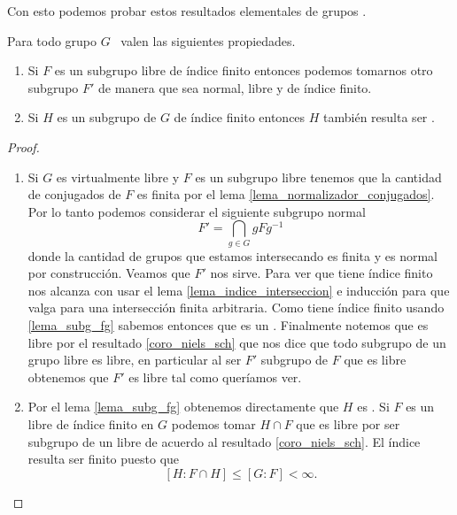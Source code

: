 \documentclass[tesis.tex]{subfiles}
\begin{document}
Con esto podemos probar estos resultados elementales de grupos \vl.

\begin{prop}\label{prop_vls}
	Para todo grupo $G$ \vl \ valen las siguientes propiedades.
	\begin{enumerate}
		\item Si $F$ es un subgrupo libre de índice finito entonces podemos tomarnos otro subgrupo $F'$ de manera que sea normal, libre y de índice finito.
		\item Si $H$ es un subgrupo de $G$ de índice finito entonces $H$ también resulta ser \vl.
	\end{enumerate}
\end{prop}

\begin{proof}
	\begin{enumerate}
		\item Si $G$ es virtualmente libre y $F$ es un subgrupo libre tenemos que la cantidad de conjugados de $F$ es finita por el lema \ref{lema_normalizador_conjugados}.
		Por lo tanto podemos considerar el siguiente subgrupo normal
		\[
		F' = \bigcap_{g \in G} gFg^{-1}
		\]
		donde la cantidad de grupos que estamos intersecando es finita y es normal por construcción.
		Veamos que $F'$ nos sirve. 
		Para ver que tiene índice finito nos alcanza con usar el lema \ref{lema_indice_interseccion} e inducción para que valga para una intersección finita arbitraria.
		Como tiene índice finito usando \ref{lema_subg_fg} sabemos entonces que es un \fg.
		Finalmente notemos que es libre por el resultado \ref{coro_niels_sch} que nos dice que todo subgrupo de un grupo libre es libre, en particular al ser $F'$ subgrupo de $F$ que es libre obtenemos que $F'$ es libre tal como queríamos ver.
		
		\item Por el lema \ref{lema_subg_fg} obtenemos directamente que $H$ es \fg.
		Si $F$ es un libre de índice finito en $G$ podemos tomar $H \cap F$ que es libre por ser subgrupo de un libre de acuerdo al resultado \ref{coro_niels_sch}.
		El índice resulta ser finito puesto que 
		\[
			[H:F\cap H] \le [G:F] < \infty.
		\]
	\end{enumerate}
\end{proof}
\end{document}
